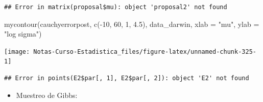 \documentclass[
  12pt,
]{book}
\newenvironment{Shaded}{\begin{snugshade}}{\end{snugshade}}
\newcommand{\AttributeTok}[1]{\textcolor[rgb]{0.77,0.63,0.00}{#1}}
\newcommand{\DecValTok}[1]{\textcolor[rgb]{0.00,0.00,0.81}{#1}}
\newcommand{\FloatTok}[1]{\textcolor[rgb]{0.00,0.00,0.81}{#1}}
\newcommand{\FunctionTok}[1]{\textcolor[rgb]{0.00,0.00,0.00}{#1}}
\newcommand{\NormalTok}[1]{#1}
\newcommand{\OtherTok}[1]{\textcolor[rgb]{0.56,0.35,0.01}{#1}}
\newcommand{\SpecialCharTok}[1]{\textcolor[rgb]{0.00,0.00,0.00}{#1}}
\newcommand{\StringTok}[1]{\textcolor[rgb]{0.31,0.60,0.02}{#1}}
\providecommand{\tightlist}{%
  \setlength{\itemsep}{0pt}\setlength{\parskip}{0pt}}
\begin{document}
\begin{verbatim}
## Error in matrix(proposal$mu): object 'proposal2' not found
\end{verbatim}

\begin{Shaded}
\begin{Highlighting}[]
\FunctionTok{mycontour}\NormalTok{(cauchyerrorpost, }\FunctionTok{c}\NormalTok{(}\SpecialCharTok{{-}}\DecValTok{10}\NormalTok{, }\DecValTok{60}\NormalTok{, }\DecValTok{1}\NormalTok{, }\FloatTok{4.5}\NormalTok{), data\_darwin,}
    \AttributeTok{xlab =} \StringTok{"mu"}\NormalTok{, }\AttributeTok{ylab =} \StringTok{"log sigma"}\NormalTok{)}
\end{Highlighting}
\end{Shaded}

\begin{center}\texttt{[image: Notas-Curso-Estadistica\_files/figure-latex/unnamed-chunk-325-1]} \end{center}

\begin{Shaded}
\end{Shaded}

\begin{verbatim}
## Error in points(E2$par[, 1], E2$par[, 2]): object 'E2' not found
\end{verbatim}

\begin{itemize}
\tightlist
\item
  Muestreo de Gibbs:
\end{itemize}

\begin{Shaded}
\end{Shaded}
\end{document}
